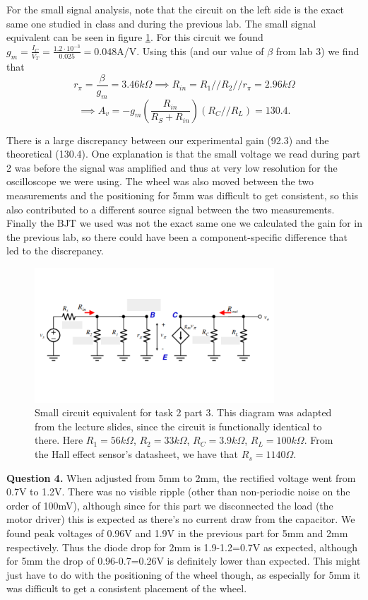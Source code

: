 \documentclass[letterpaper, reqno,11pt]{article}
\begin{document}
For the small signal analysis, note that the circuit on the left side is the exact same one studied in class and during the previous lab. The small signal equivalent can be seen in figure \ref{fig:q3}. For this circuit we found $g_m= \frac{I_C}{V_T}=\frac{1.2\cdot 10^{-3}}{0.025}=0.048$A/V. Using this (and our value of $\beta$ from lab 3) we find that
\[
    r_{\pi}=\frac{\beta}{g_{m}}=3.46k\Omega\implies R_{in}= R_1 // R_2 / / r_{\pi}=2.96k\Omega
\]
\[
\implies A_v=-g_m \left( \frac{R_{in}}{R_S+R_{in}} \right) \left( R_C / / R_L \right) =130.4
.\]

There is a large discrepancy between our experimental gain (92.3) and the theoretical (130.4). One explanation is that the small voltage we read during part 2 was before the signal was amplified and thus at very low resolution for the oscilloscope we were using. The wheel was also moved between the two measurements and the positioning for 5mm was difficult to get consistent, so this also contributed to a different source signal between the two measurements. Finally the BJT we used was not the exact same one we calculated the gain for in the previous lab, so there could have been a component-specific difference that led to the discrepancy.

\begin{figure}[htpb]
    \centering
    \includegraphics[width=0.8\textwidth]{q3}
    \caption{Small circuit equivalent for task 2 part 3. This diagram was adapted from the lecture slides, since the circuit is functionally identical to there. Here $R_1=56k\Omega$, $R_2=33k\Omega$, $R_C=3.9k\Omega$, $R_L=100k\Omega$. From the Hall effect sensor's datasheet, we have that $R_s=1140\Omega$.}
    \label{fig:q3}
\end{figure}

{\medskip\noindent\bf Question 4.} When adjusted from 5mm to 2mm, the rectified voltage went from 0.7V to 1.2V. There was no visible ripple (other than non-periodic noise on the order of 100mV), although since for this part we disconnected the load (the motor driver) this is expected as there's no current draw from the capacitor. We found peak voltages of 0.96V and 1.9V in the previous part for 5mm and 2mm respectively. Thus the diode drop for 2mm is 1.9-1.2=0.7V as expected, although for 5mm the drop of 0.96-0.7=0.26V is definitely lower than expected. This might just have to do with the positioning of the wheel though, as especially for 5mm it was difficult to get a consistent placement of the wheel.
\end{document}

